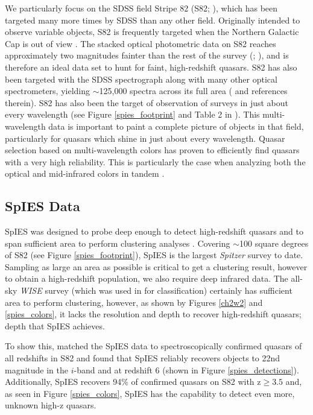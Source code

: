 \documentclass[onecolumn]{emulateapj}
\begin{document}
We particularly focus on the SDSS field Stripe 82 (S82; \citealt{Stoughton2002}), which has been targeted many more times by SDSS than any other field. Originally intended to observe variable objects, S82 is frequently targeted when the Northern Galactic Cap is out of view \citep{York2000}. The stacked optical photometric data on S82 reaches approximately two magnitudes fainter than the rest of the survey (\citealt{Annis2014}; \citealt{Jiang2014}), and is therefore an ideal data set to hunt for faint, high-redshift quasars. S82 has also been targeted with the SDSS spectrograph along with many other optical spectrometers, yielding $\sim$125,000 spectra across its full area (\citealt{Timlin2016} and references therein). S82 has also been the target of observation of surveys in just about every wavelength (see Figure \ref{spies_footprint} and Table 2 in \citealt{Timlin2016}). This multi-wavelength data is important to paint a complete picture of objects in that field, particularly for quasars which shine in just about every wavelength. Quasar selection based on multi-wavelength colors has proven to efficiently find quasars with a very high reliability. This is particularly the case when analyzing both the optical and mid-infrared colors in tandem \citep{Richards2015}.

\subsection{SpIES Data}
SpIES was designed to probe deep enough to detect high-redshift quasars and to span sufficient area to perform clustering analyses \citep{Timlin2016}. Covering $\sim$100 square degrees of S82 (see Figure \ref{spies_footprint}), SpIES is the largest \emph{Spitzer} survey to date. Sampling as large an area as possible is critical to get a clustering result, however to obtain a high-redshift population, we also require deep infrared data. The all-sky \emph{WISE} survey (which was used in \citealt{Richards2015} for classification) certainly has sufficient area to perform clustering, however, as shown by Figures \ref{ch2w2} and \ref{spies_colors}, it lacks the resolution and depth to recover high-redshift quasars; depth that SpIES achieves. 

To show this, \citet{Timlin2016} matched the SpIES data to spectroscopically confirmed quasars of all redshifts in S82 and found that SpIES reliably recovers objects to 22nd magnitude in the $i$-band and at redshift 6 (shown in Figure \ref{spies_detections}). Additionally, SpIES recovers 94\% of confirmed quasars on S82 with z$\ge3.5$ and, as seen in Figure \ref{spies_colors}, SpIES has the capability to detect even more, unknown high-z quasars.
\end{document}

